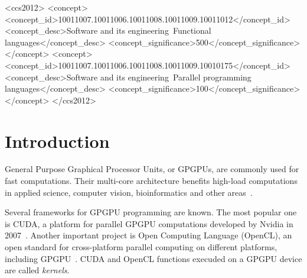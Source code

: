 \documentclass[sigplan,review]{acmart}\settopmatter{printfolios=true}
\begin{document}
\begin{CCSXML}
<ccs2012>
<concept>
<concept_id>10011007.10011006.10011008.10011009.10011012</concept_id>
<concept_desc>Software and its engineering~Functional languages</concept_desc>
<concept_significance>500</concept_significance>
</concept>
<concept>
<concept_id>10011007.10011006.10011008.10011009.10010175</concept_id>
<concept_desc>Software and its engineering~Parallel programming languages</concept_desc>
<concept_significance>100</concept_significance>
</concept>
</ccs2012>
\end{CCSXML}




\maketitle


\section{Introduction} %

General Purpose Graphical Processor Units, or GPGPUs, are commonly used for fast computations. Their multi-core architecture benefits high-load computations in applied science, computer vision, bioinformatics and other areas~\cite{CUDA_to_OpenCL, GPGPU_1}.

Several frameworks for GPGPU programming are known. The most popular one is CUDA, a platform for parallel GPGPU computations developed by Nvidia in 2007~\cite{CUDA}. Another important project is Open Computing Language (OpenCL), an open standard for cross-platform parallel computing on different platforms, including GPGPU~\cite{OpenCL}. CUDA and OpenCL functions execuded on a GPGPU device are called \textit{kernels}.
\end{document}
